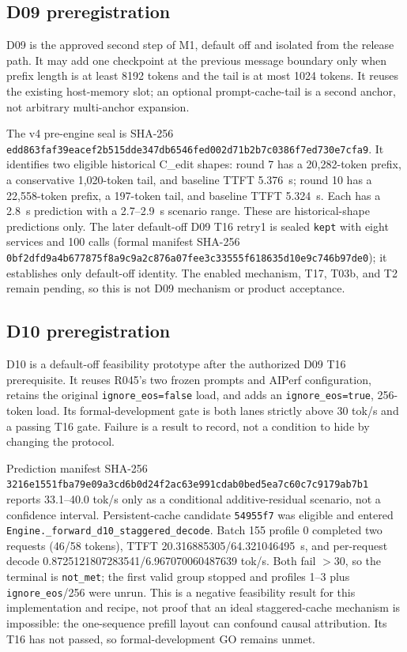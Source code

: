 \documentclass[11pt]{article}
\begin{document}
\subsection{D09 preregistration}

D09 is the approved second step of M1, default off and isolated from the release path. It may add one checkpoint at the previous message boundary only when prefix length is at least 8192 tokens and the tail is at most 1024 tokens. It reuses the existing host-memory slot; an optional prompt-cache-tail is a second anchor, not arbitrary multi-anchor expansion.

The v4 pre-engine seal is SHA-256 \texttt{edd863faf39eacef2b515dde347db6546fed002d71b2b7c0386f7ed730e7cfa9}. It identifies two eligible historical C\_edit shapes: round 7 has a 20,282-token prefix, a conservative 1,020-token tail, and baseline TTFT 5.376~s; round 10 has a 22,558-token prefix, a 197-token tail, and baseline TTFT 5.324~s. Each has a 2.8~s prediction with a 2.7--2.9~s scenario range. These are historical-shape predictions only. The later default-off D09 T16 retry1 is sealed \texttt{kept} with eight services and 100 calls (formal manifest SHA-256 \texttt{0bf2dfd9a4b677875f8a9c9a2c876a07fee3c33555f618635d10e9c746b97de0}); it establishes only default-off identity. The enabled mechanism, T17, T03b, and T2 remain pending, so this is not D09 mechanism or product acceptance.

\subsection{D10 preregistration}

D10 is a default-off feasibility prototype after the authorized D09 T16 prerequisite. It reuses R045's two frozen prompts and AIPerf configuration, retains the original \texttt{ignore\_eos=false} load, and adds an \texttt{ignore\_eos=true}, 256-token load. Its formal-development gate is both lanes strictly above 30 tok/s and a passing T16 gate. Failure is a result to record, not a condition to hide by changing the protocol.

Prediction manifest SHA-256 \texttt{3216e1551fba79e09a3cd6b0d24f2ac63e991cdab0bed5ea7c60c7c9179ab7b1} reports 33.1--40.0 tok/s only as a conditional additive-residual scenario, not a confidence interval. Persistent-cache candidate \texttt{54955f7} was eligible and entered \texttt{Engine.\_forward\_d10\_staggered\_decode}. Batch 155 profile 0 completed two requests (46/58 tokens), TTFT 20.316885305/64.321046495~s, and per-request decode 0.8725121807283541/6.967070060487639 tok/s. Both fail $>30$, so the terminal is \texttt{not\_met}; the first valid group stopped and profiles 1--3 plus \texttt{ignore\_eos}/256 were unrun. This is a negative feasibility result for this implementation and recipe, not proof that an ideal staggered-cache mechanism is impossible: the one-sequence prefill layout can confound causal attribution. Its T16 has not passed, so formal-development GO remains unmet.
\end{document}
